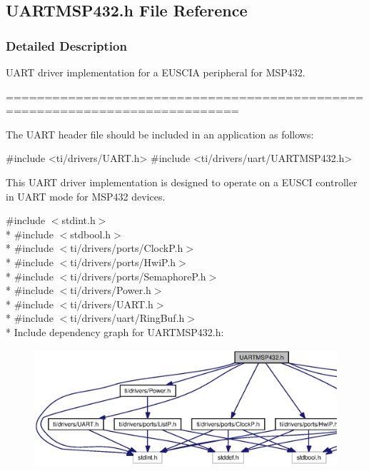 \subsection{U\+A\+R\+T\+M\+S\+P432.\+h File Reference}
\label{_u_a_r_t_m_s_p432_8h}


\subsubsection{Detailed Description}
U\+A\+R\+T driver implementation for a E\+U\+S\+C\+I\+A peripheral for M\+S\+P432. 

============================================================================

The U\+A\+R\+T header file should be included in an application as follows\+: 
\begin{DoxyCode}
\textcolor{preprocessor}{#include <ti/drivers/UART.h>}
\textcolor{preprocessor}{#include <ti/drivers/uart/UARTMSP432.h>}
\end{DoxyCode}


This U\+A\+R\+T driver implementation is designed to operate on a E\+U\+S\+C\+I controller in U\+A\+R\+T mode for M\+S\+P432 devices. 

{\ttfamily \#include $<$stdint.\+h$>$}\\*
{\ttfamily \#include $<$stdbool.\+h$>$}\\*
{\ttfamily \#include $<$ti/drivers/ports/\+Clock\+P.\+h$>$}\\*
{\ttfamily \#include $<$ti/drivers/ports/\+Hwi\+P.\+h$>$}\\*
{\ttfamily \#include $<$ti/drivers/ports/\+Semaphore\+P.\+h$>$}\\*
{\ttfamily \#include $<$ti/drivers/\+Power.\+h$>$}\\*
{\ttfamily \#include $<$ti/drivers/\+U\+A\+R\+T.\+h$>$}\\*
{\ttfamily \#include $<$ti/drivers/uart/\+Ring\+Buf.\+h$>$}\\*
Include dependency graph for U\+A\+R\+T\+M\+S\+P432.\+h\+:
\nopagebreak
\begin{figure}[H]
\begin{center}
\leavevmode
\includegraphics[width=350pt]{_u_a_r_t_m_s_p432_8h__incl}
\end{center}
\end{figure}
